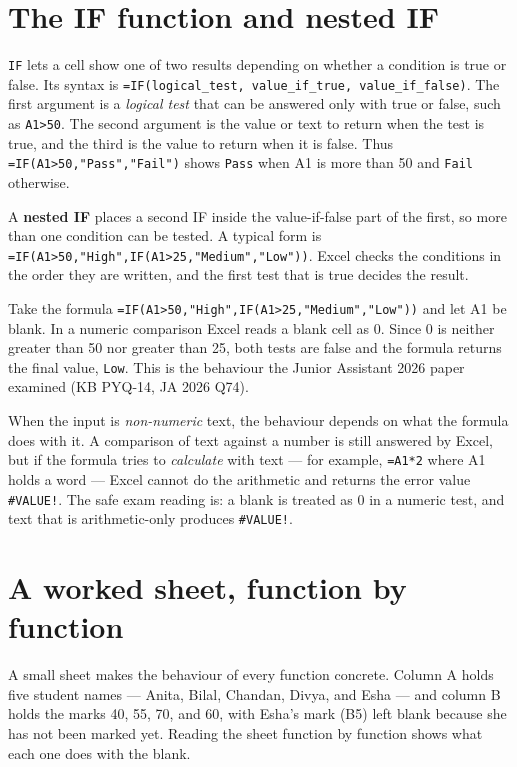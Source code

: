 \section{The IF function and nested IF}
\texttt{IF} lets a cell show one of two results depending on whether a
condition is true or false. Its syntax is
\texttt{=IF(logical\_test, value\_if\_true, value\_if\_false)}. The first
argument is a \emph{logical test} that can be answered only with true or
false, such as \texttt{A1>50}. The second argument is the value or text to
return when the test is true, and the third is the value to return when it is
false. Thus \texttt{=IF(A1>50,"Pass","Fail")} shows \texttt{Pass} when A1 is
more than 50 and \texttt{Fail} otherwise.

A \textbf{nested IF} places a second IF inside the value-if-false part of the
first, so more than one condition can be tested. A typical form is
\texttt{=IF(A1>50,"High",IF(A1>25,"Medium","Low"))}. Excel checks the
conditions in the order they are written, and the first test that is true
decides the result.

\begin{example}
Take the formula \texttt{=IF(A1>50,"High",IF(A1>25,"Medium","Low"))} and let
A1 be blank. In a numeric comparison Excel reads a blank cell as $0$. Since
$0$ is neither greater than 50 nor greater than 25, both tests are false and
the formula returns the final value, \texttt{Low}. This is the behaviour the
Junior Assistant 2026 paper examined (KB PYQ-14, JA 2026 Q74).
\end{example}

When the input is \emph{non-numeric} text, the behaviour depends on what the
formula does with it. A comparison of text against a number is still answered
by Excel, but if the formula tries to \emph{calculate} with text --- for
example, \texttt{=A1*2} where A1 holds a word --- Excel cannot do the
arithmetic and returns the error value \texttt{\#VALUE!}. The safe exam
reading is: a blank is treated as 0 in a numeric test, and text that is
arithmetic-only produces \texttt{\#VALUE!}.

\section{A worked sheet, function by function}
A small sheet makes the behaviour of every function concrete. Column A holds
five student names --- Anita, Bilal, Chandan, Divya, and Esha --- and column B
holds the marks 40, 55, 70, and 60, with Esha's mark (B5) left blank because
she has not been marked yet. Reading the sheet function by function shows what
each one does with the blank.

